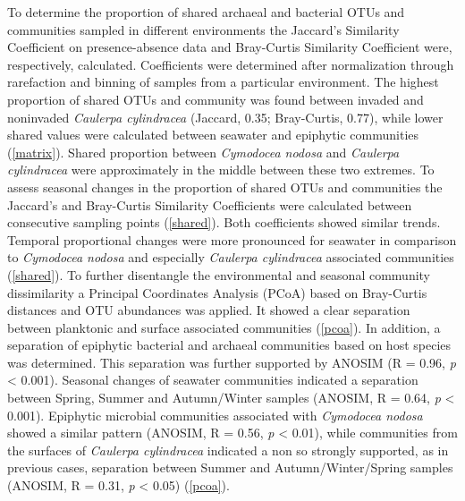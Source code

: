 \documentclass[12pt,]{article}
\begin{document}
To determine the proportion of shared archaeal and bacterial OTUs and
communities sampled in different environments the Jaccard's Similarity
Coefficient on presence-absence data and Bray-Curtis Similarity
Coefficient were, respectively, calculated. Coefficients were determined
after normalization through rarefaction and binning of samples from a
particular environment. The highest proportion of shared OTUs and
community was found between invaded and noninvaded \emph{Caulerpa
cylindracea} (Jaccard, 0.35; Bray-Curtis, 0.77), while lower shared
values were calculated between seawater and epiphytic communities
(\autoref{matrix}). Shared proportion between \emph{Cymodocea nodosa}
and \emph{Caulerpa cylindracea} were approximately in the middle between
these two extremes. To assess seasonal changes in the proportion of
shared OTUs and communities the Jaccard's and Bray-Curtis Similarity
Coefficients were calculated between consecutive sampling points
(\autoref{shared}). Both coefficients showed similar trends. Temporal
proportional changes were more pronounced for seawater in comparison to
\emph{Cymodocea nodosa} and especially \emph{Caulerpa cylindracea}
associated communities (\autoref{shared}). To further disentangle the
environmental and seasonal community dissimilarity a Principal
Coordinates Analysis (PCoA) based on Bray-Curtis distances and OTU
abundances was applied. It showed a clear separation between planktonic
and surface associated communities (\autoref{pcoa}). In addition, a
separation of epiphytic bacterial and archaeal communities based on host
species was determined. This separation was further supported by ANOSIM
(R = 0.96, \emph{p} \textless{} 0.001). Seasonal changes of seawater
communities indicated a separation between Spring, Summer and
Autumn/Winter samples (ANOSIM, R = 0.64, \emph{p} \textless{} 0.001).
Epiphytic microbial communities associated with \emph{Cymodocea nodosa}
showed a similar pattern (ANOSIM, R = 0.56, \emph{p} \textless{} 0.01),
while communities from the surfaces of \emph{Caulerpa cylindracea}
indicated a non so strongly supported, as in previous cases, separation
between Summer and Autumn/Winter/Spring samples (ANOSIM, R = 0.31,
\emph{p} \textless{} 0.05) (\autoref{pcoa}).
\end{document}
